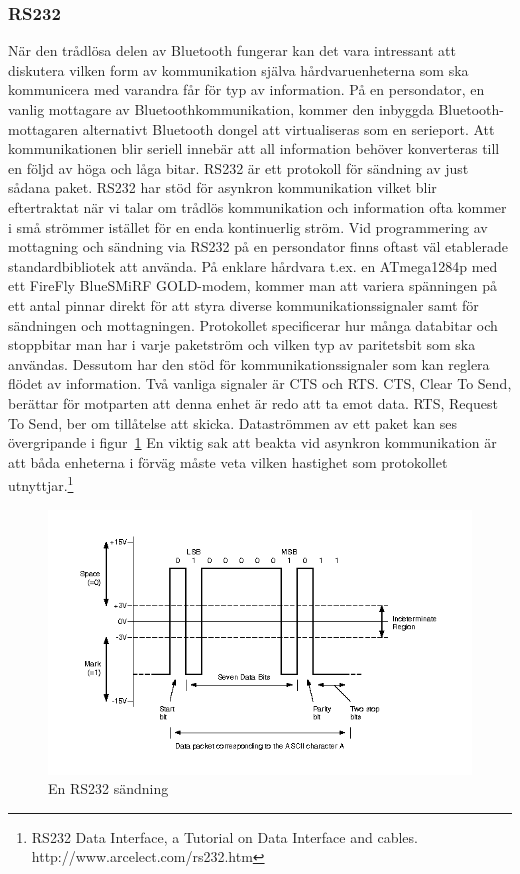 \documentclass[a4paper,12pt,fleqn]{article}
\begin{document}
\subsubsection{RS232}
När den trådlösa delen av Bluetooth fungerar kan det vara intressant att diskutera vilken form av kommunikation själva hårdvaruenheterna som ska kommunicera med varandra får för typ av information. På en persondator, en vanlig mottagare av Bluetoothkommunikation, kommer den inbyggda Bluetooth-mottagaren alternativt Bluetooth dongel att virtualiseras som en serieport. Att kommunikationen blir seriell innebär att all information behöver konverteras till en följd av höga och låga bitar. RS232 är ett protokoll för sändning av just sådana paket. RS232 har stöd för asynkron kommunikation vilket blir eftertraktat när vi talar om trådlös kommunikation och information ofta kommer i små strömmer istället för  en enda kontinuerlig ström. Vid programmering av mottagning och sändning via RS232 på en persondator finns oftast väl etablerade standardbibliotek att använda.
På enklare hårdvara t.ex. en ATmega1284p med ett FireFly BlueSMiRF GOLD-modem, kommer man att variera spänningen på ett antal pinnar direkt för att styra diverse kommunikationssignaler samt för sändningen och mottagningen.
Protokollet specificerar hur många databitar och stoppbitar man har i varje paketström och vilken typ av paritetsbit som ska användas. Dessutom har den stöd för kommunikationssignaler som kan reglera flödet av information. Två vanliga signaler är CTS och RTS. CTS, Clear To Send, berättar för motparten att denna enhet är redo att ta emot data. RTS, Request To Send, ber om tillåtelse att skicka. Dataströmmen av ett paket kan ses övergripande i figur~\ref{fig:rs232}
En viktig sak att beakta vid asynkron kommunikation är att båda enheterna i förväg måste veta vilken hastighet som protokollet utnyttjar.\footnote{RS232 Data Interface, a Tutorial on Data Interface and cables. http://www.arcelect.com/rs232.htm}

\begin{figure}[htp]
  \begin{center}
  \includegraphics[keepaspectratio=true,width=0.5\linewidth]{RS232}  %
  \caption{En RS232 sändning\label{fig:rs232}} %
  \end{center}
\end{figure}
\end{document}

